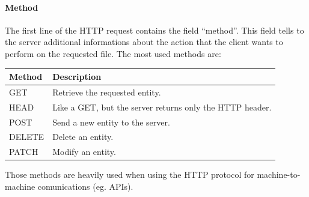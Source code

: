 \documentclass{article}
\begin{document}
\paragraph{Method}
The first line of the HTTP request contains the field ``method''. This field tells to the server additional informations about the action that the client wants to perform on the requested file. The most used methods are:
\begin{center}
    \begin{tabular}{l|l}
        \toprule
        \textbf{Method} & \textbf{Description}                                     \\
        \midrule
        GET             & Retrieve the requested entity.                           \\
        HEAD            & Like a GET, but the server returns only the HTTP header. \\
        POST            & Send a new entity to the server.                         \\
        DELETE          & Delete an entity.                                        \\
        PATCH           & Modify an entity.                                        \\
        \bottomrule
    \end{tabular}
\end{center}
Those methods are heavily used when using the HTTP protocol for machine-to-machine comunications (eg. APIs).
\end{document}
